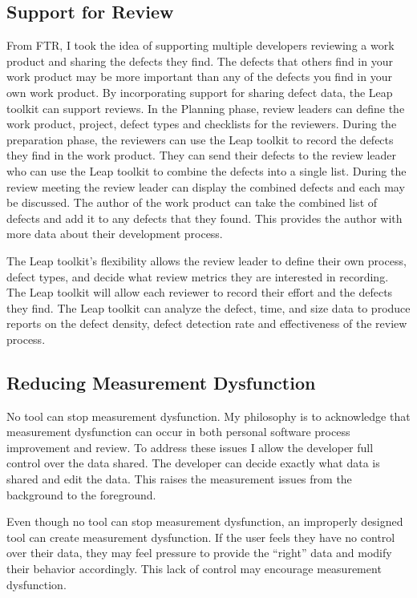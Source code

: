 \subsection{Support for Review}

From FTR, I took the idea of supporting multiple developers reviewing a work
product and sharing the defects they find. The defects that others find in your
work product may be more important than any of the defects you find in your own
work product.  By incorporating support for sharing defect data, the Leap
toolkit can support reviews.  In the Planning phase, review leaders can define
the work product, project, defect types and checklists for the reviewers.
During the preparation phase, the reviewers can use the Leap toolkit to record
the defects they find in the work product.  They can send their defects to the
review leader who can use the Leap toolkit to combine the defects into a single 
list.  During the review meeting the review leader can display the combined
defects and each may be discussed.  The author of the work product can take the
combined list of defects and add it to any defects that they found.  This
provides the author with more data about their development process.  

The Leap toolkit's flexibility allows the review leader to define their own
process, defect types, and decide what review metrics they are interested in
recording.  The Leap toolkit will allow each reviewer to record their effort and
the defects they find.  The Leap toolkit can analyze the defect, time, and size
data to produce reports on the defect density, defect detection rate and
effectiveness of the review process.

\subsection{Reducing Measurement Dysfunction}

No tool can stop measurement dysfunction.  My philosophy is to acknowledge that
measurement dysfunction can occur in both personal software process improvement
and review.  To address these issues I allow the developer full control over
the data shared.  The developer can decide exactly what data is shared and edit
the data.  This raises the measurement issues from the background to the
foreground.  

Even though no tool can stop measurement dysfunction, an improperly designed
tool can create measurement dysfunction.  If the user feels they have no
control over their data, they may feel pressure to provide the ``right'' data
and modify their behavior accordingly.  This lack of control may encourage
measurement dysfunction.

